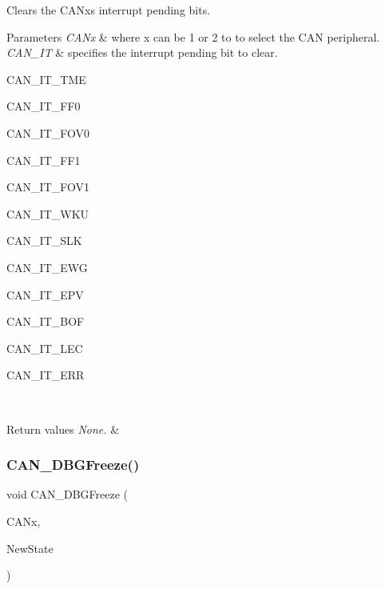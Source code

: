 Clears the C\+A\+Nx\textquotesingle{}s interrupt pending bits. 


\begin{DoxyParams}{Parameters}
{\em C\+A\+Nx} & where x can be 1 or 2 to to select the C\+AN peripheral. \\
\hline
{\em C\+A\+N\+\_\+\+IT} & specifies the interrupt pending bit to clear.
\begin{DoxyItemize}
\item C\+A\+N\+\_\+\+I\+T\+\_\+\+T\+ME
\item C\+A\+N\+\_\+\+I\+T\+\_\+\+F\+F0
\item C\+A\+N\+\_\+\+I\+T\+\_\+\+F\+O\+V0
\item C\+A\+N\+\_\+\+I\+T\+\_\+\+F\+F1
\item C\+A\+N\+\_\+\+I\+T\+\_\+\+F\+O\+V1
\item C\+A\+N\+\_\+\+I\+T\+\_\+\+W\+KU
\item C\+A\+N\+\_\+\+I\+T\+\_\+\+S\+LK
\item C\+A\+N\+\_\+\+I\+T\+\_\+\+E\+WG
\item C\+A\+N\+\_\+\+I\+T\+\_\+\+E\+PV
\item C\+A\+N\+\_\+\+I\+T\+\_\+\+B\+OF
\item C\+A\+N\+\_\+\+I\+T\+\_\+\+L\+EC
\item C\+A\+N\+\_\+\+I\+T\+\_\+\+E\+RR 
\end{DoxyItemize}\\
\hline
\end{DoxyParams}

\begin{DoxyRetVals}{Return values}
{\em None.} & \\
\hline
\end{DoxyRetVals}
\mbox{\label{group___c_a_n___private___functions_gac0e2d33e08caf49d1f1251f0dcc20213}} 
\subsubsection{\texorpdfstring{CAN\_DBGFreeze()}{CAN\_DBGFreeze()}}
{\footnotesize\ttfamily void C\+A\+N\+\_\+\+D\+B\+G\+Freeze (\begin{DoxyParamCaption}\item[{\mbox{\hyperlink{struct_c_a_n___type_def}{C\+A\+N\+\_\+\+Type\+Def}} $\ast$}]{C\+A\+Nx,  }\item[{\mbox{\hyperlink{group___exported__types_gac9a7e9a35d2513ec15c3b537aaa4fba1}{Functional\+State}}}]{New\+State }\end{DoxyParamCaption})}



